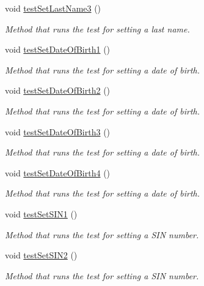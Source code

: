 \begin{DoxyCompactItemize}
void \hyperlink{class_all_employees_test_1_1_all_employees_tests_af86f979a6fc0e25115aef208270868fc}{test\+Set\+Last\+Name3} ()
\begin{DoxyCompactList}\small\item\em Method that runs the test for setting a last name. \end{DoxyCompactList}\item 
void \hyperlink{class_all_employees_test_1_1_all_employees_tests_a29b07d8bbe2384941ddfa715f39d756a}{test\+Set\+Date\+Of\+Birth1} ()
\begin{DoxyCompactList}\small\item\em Method that runs the test for setting a date of birth. \end{DoxyCompactList}\item 
void \hyperlink{class_all_employees_test_1_1_all_employees_tests_a7be38c1c9926fe1ee5d964ff27d95221}{test\+Set\+Date\+Of\+Birth2} ()
\begin{DoxyCompactList}\small\item\em Method that runs the test for setting a date of birth. \end{DoxyCompactList}\item 
void \hyperlink{class_all_employees_test_1_1_all_employees_tests_a74736b11966058425d6b2a4e418695fb}{test\+Set\+Date\+Of\+Birth3} ()
\begin{DoxyCompactList}\small\item\em Method that runs the test for setting a date of birth. \end{DoxyCompactList}\item 
void \hyperlink{class_all_employees_test_1_1_all_employees_tests_a14a113018838846958711e369a2a2eb9}{test\+Set\+Date\+Of\+Birth4} ()
\begin{DoxyCompactList}\small\item\em Method that runs the test for setting a date of birth. \end{DoxyCompactList}\item 
void \hyperlink{class_all_employees_test_1_1_all_employees_tests_a2d948e3861d4b8d3d5fa3645660aa80a}{test\+Set\+S\+I\+N1} ()
\begin{DoxyCompactList}\small\item\em Method that runs the test for setting a S\+I\+N number. \end{DoxyCompactList}\item 
void \hyperlink{class_all_employees_test_1_1_all_employees_tests_a43b6aa9c0522d2fb1bf179f574c1bee6}{test\+Set\+S\+I\+N2} ()
\begin{DoxyCompactList}\small\item\em Method that runs the test for setting a S\+I\+N number. \end{DoxyCompactList}\item 

\end{DoxyCompactItemize}
